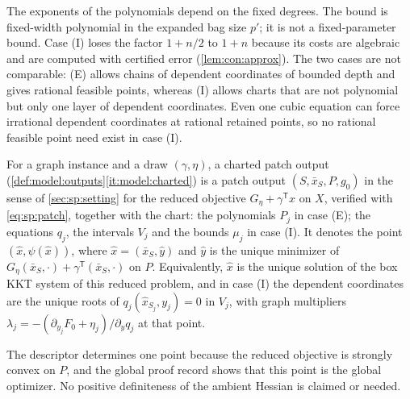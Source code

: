 The exponents of the polynomials depend on the fixed degrees. The bound is
fixed-width polynomial in the expanded bag size $p'$; it is not a
fixed-parameter bound. Case (I) loses the factor $1+n/2$ to $1+n$ because its
costs are algebraic and are computed with certified error
(\cref{lem:con:approx}). The two cases are not comparable: (E) allows chains of
dependent coordinates of bounded depth and gives rational feasible points,
whereas (I) allows charts that are not polynomial but only one layer of
dependent coordinates. Even one cubic equation can force irrational dependent
coordinates at rational retained points, so no rational feasible point
need exist in case (I).

\begin{definition}\label{def:con:charted}
For a graph instance and a draw $(\gamma,\eta)$, a charted patch output
(\cref{def:model:outputs}\ref{it:model:charted}) is a
patch output $(S,\bar x_S,P,g_0)$ in the sense of \cref{sec:sp:setting} for
the reduced objective $G_\eta+\gamma^{\mathsf T}x$ on $X$, verified with
\eqref{eq:sp:patch}, together with the chart: the polynomials $P_j$ in case
(E); the equations $q_j$, the intervals $V_j$ and the bounds $\mu_j$ in case
(I). It denotes the point $(\hat x,\psi(\hat x))$, where $\hat x=(\bar x_S,
\hat y)$ and $\hat y$ is the unique minimizer of $G_\eta(\bar x_S,\cdot)+
\gamma^{\mathsf T}(\bar x_S,\cdot)$ on $P$. Equivalently, $\hat x$ is the
unique solution of the box KKT system of this reduced problem, and in case
(I) the dependent coordinates are the unique roots of $q_j(\hat x_{S_j},y_j)=0$
in $V_j$, with graph multipliers
$\lambda_j=-(\partial_{y_j}F_0+\eta_j)/\partial_yq_j$ at that point.
\end{definition}

The descriptor determines one point because the reduced objective is
strongly convex on $P$, and the global proof record shows that this point is
the global optimizer. No positive definiteness of the ambient Hessian is
claimed or needed.

